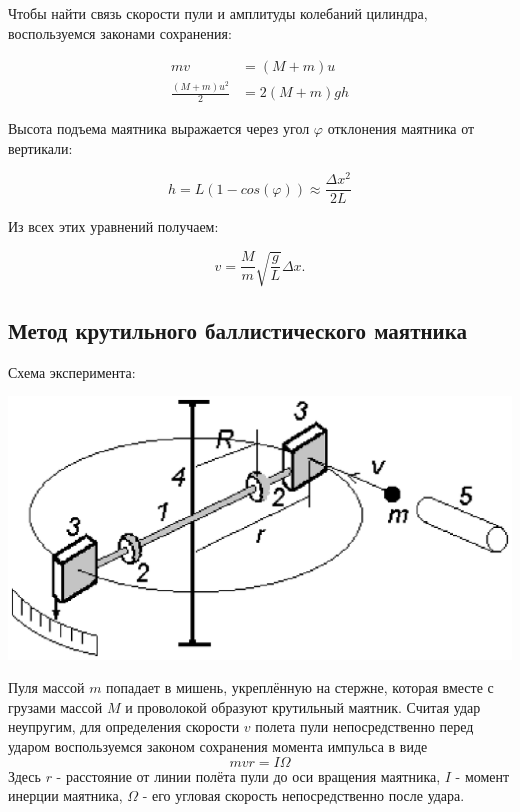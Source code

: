 \documentclass[a4paper, 12pt]{article}
\begin{document}
			Чтобы найти связь скорости пули и амплитуды колебаний цилиндра, воспользуемся законами сохранения:

			\begin{align*}
				mv &= (M + m)u \\
				\frac{(M + m)u^2}{2} &= 2(M + m)gh
			\end{align*}

			Высота подъема маятника выражается через угол $\varphi$ отклонения маятника от вертикали:

			\[
				h = L(1-cos(\varphi)) \approx \frac{\Delta x^2}{2L}
			\]

			Из всех этих уравнений получаем:

			\begin{equation} \label{eq:v1}
				v = \frac{M}{m}\sqrt{\frac{g}{L}}\Delta x \text{.}
			\end{equation}

		\subsection{Метод крутильного баллистического маятника}

			Схема эксперимента:

			\begin{center}
				\includegraphics[scale = 0.5]{pend2.eps}
			\end{center}

			Пуля массой $m$ попадает в мишень, укреплённую на стержне, которая вместе с грузами массой $M$
			и проволокой образуют крутильный маятник. Считая удар неупругим, для определения скорости $v$ полета
			пули непосредственно перед ударом воспользуемся законом сохранения момента импульса в виде
			\begin{equation} \label{eq:moment}
				mvr = I\Omega
			\end{equation}
			Здесь $r$ - расстояние от линии полёта пули до оси вращения маятника, $I$ - момент инерции маятника, $\Omega$ - 
			его угловая скорость непосредственно после удара.
\end{document}
